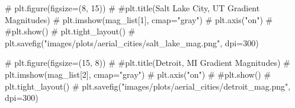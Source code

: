 \documentclass[
  letterpaper,
  DIV=11,
  numbers=noendperiod]{scrreprt}
\newenvironment{Shaded}{\begin{snugshade}}{\end{snugshade}}
\newcommand{\CommentTok}[1]{\textcolor[rgb]{0.37,0.37,0.37}{#1}}
\begin{document}
\begin{Shaded}
\begin{Highlighting}[]
\CommentTok{\# plt.figure(figsize=(8, 15))}
\CommentTok{\# \#plt.title(\textquotesingle{}Salt Lake City, UT Gradient Magnitudes\textquotesingle{})}
\CommentTok{\# plt.imshow(mag\_list[1], cmap="gray")}
\CommentTok{\# plt.axis("on")}
\CommentTok{\# \#plt.show()}
\CommentTok{\# plt.tight\_layout()}
\CommentTok{\# plt.savefig("images/plots/aerial\_cities/salt\_lake\_mag.png", dpi=300)}
\end{Highlighting}
\end{Shaded}

\begin{Shaded}
\begin{Highlighting}[]
\CommentTok{\# plt.figure(figsize=(15, 8))}
\CommentTok{\# \#plt.title(\textquotesingle{}Detroit, MI Gradient Magnitudes\textquotesingle{})}
\CommentTok{\# plt.imshow(mag\_list[2], cmap="gray")}
\CommentTok{\# plt.axis("on")}
\CommentTok{\# \#plt.show()}
\CommentTok{\# plt.tight\_layout()}
\CommentTok{\# plt.savefig("images/plots/aerial\_cities/detroit\_mag.png", dpi=300)}
\end{Highlighting}
\end{Shaded}
\end{document}
